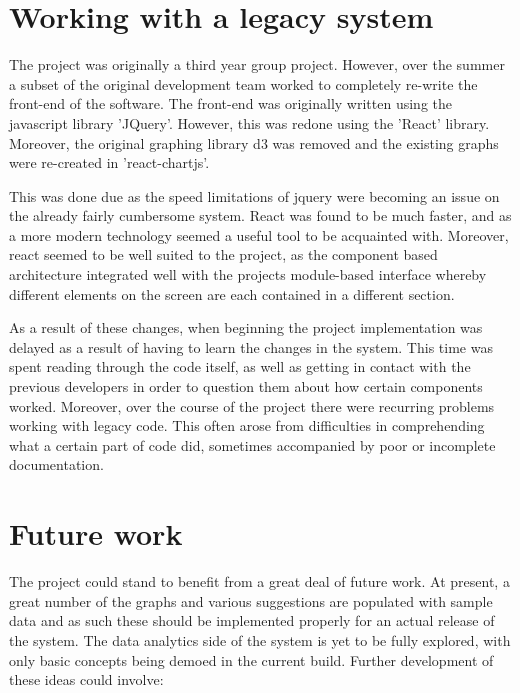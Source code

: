 \documentclass{l4proj}
\begin{document}
\chapter{Working with a legacy system}

The project was originally a third year group project.  However, over the summer a subset of the original development team worked to completely re-write the front-end of the software.  The front-end was originally written using the javascript library 'JQuery'.  However, this was redone using the 'React' library.  Moreover, the original graphing library d3 was removed and the existing graphs were re-created in 'react-chartjs'.

This was done due as the speed limitations of jquery were becoming an issue on the already fairly cumbersome system.  React was found to be much faster, and as a more modern technology seemed a useful tool to be acquainted with.  Moreover, react seemed to be well suited to the project, as the component based architecture integrated well with the projects module-based interface whereby different elements on the screen are each contained in a different section.

As a result of these changes, when beginning the project implementation was delayed as a result of having to learn the changes in the system.  This time was spent reading through the code itself, as well as getting in contact with the previous developers in order to question them about how certain components worked.  Moreover, over the course of the project there were recurring problems working with legacy code.  This often arose from difficulties in comprehending what a certain part of code did, sometimes accompanied by poor or incomplete documentation.

\chapter{Future work}

The project could stand to benefit from a great deal of future work.  At present, a great number of the graphs and various suggestions are populated with sample data and as such these should be implemented properly for an actual release of the system.  The data analytics side of the system is yet to be fully explored, with only basic concepts being demoed in the current build.  Further development of these ideas could involve:
\end{document}
